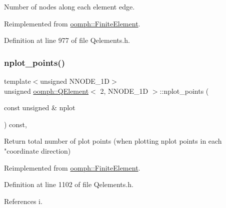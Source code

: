 Number of nodes along each element edge. 



Reimplemented from \hyperlink{classoomph_1_1FiniteElement_ab65c7a94dda80c1876a09ac12be4e39c}{oomph\+::\+Finite\+Element}.



Definition at line 977 of file Qelements.\+h.

\mbox{\label{classoomph_1_1QElement_3_012_00_01NNODE__1D_01_4_a19edc23319f98594ea429fa9bfe859ed}} 
\subsubsection{\texorpdfstring{nplot\+\_\+points()}{nplot\_points()}}
{\footnotesize\ttfamily template$<$unsigned N\+N\+O\+D\+E\+\_\+1D$>$ \\
unsigned \hyperlink{classoomph_1_1QElement}{oomph\+::\+Q\+Element}$<$ 2, N\+N\+O\+D\+E\+\_\+1D $>$\+::nplot\+\_\+points (\begin{DoxyParamCaption}\item[{const unsigned \&}]{nplot }\end{DoxyParamCaption}) const\hspace{0.3cm}{\ttfamily [inline]}, {\ttfamily [virtual]}}

Return total number of plot points (when plotting nplot points in each "coordinate direction) 

Reimplemented from \hyperlink{classoomph_1_1FiniteElement_a8ed563c7ff0cfd8bafdbb0132b388106}{oomph\+::\+Finite\+Element}.



Definition at line 1102 of file Qelements.\+h.



References i.

\mbox{\label{classoomph_1_1QElement_3_012_00_01NNODE__1D_01_4_a8b0697ca30704a6f0a64f1a0b744f587}} 
